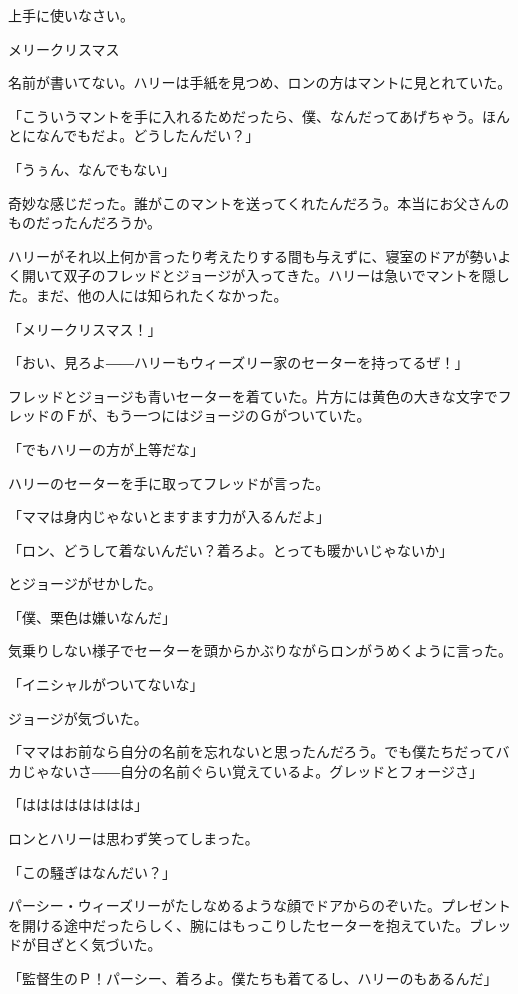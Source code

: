 \documentclass[10pt,a4paper]{article}
\begin{document}
\begin{CJK}{UTF8}{min}
上手に使いなさい。

メリークリスマス



名前が書いてない。ハリーは手紙を見つめ、ロンの方はマントに見とれていた。

「こういうマントを手に入れるためだったら、僕、なんだってあげちゃう。ほんとになんでもだよ。どうしたんだい？」

「うぅん、なんでもない」

奇妙な感じだった。誰がこのマントを送ってくれたんだろう。本当にお父さんのものだったんだろうか。

ハリーがそれ以上何か言ったり考えたりする間も与えずに、寝室のドアが勢いよく開いて双子のフレッドとジョージが入ってきた。ハリーは急いでマントを隠した。まだ、他の人には知られたくなかった。

「メリークリスマス！」

「おい、見ろよ――ハリーもウィーズリー家のセーターを持ってるぜ！」

フレッドとジョージも青いセーターを着ていた。片方には黄色の大きな文字でフレッドのＦが、もう一つにはジョージのＧがついていた。

「でもハリーの方が上等だな」

ハリーのセーターを手に取ってフレッドが言った。

「ママは身内じゃないとますます力が入るんだよ」

「ロン、どうして着ないんだい？着ろよ。とっても暖かいじゃないか」

とジョージがせかした。

「僕、栗色は嫌いなんだ」

気乗りしない様子でセーターを頭からかぶりながらロンがうめくように言った。

「イニシャルがついてないな」

ジョージが気づいた。

「ママはお前なら自分の名前を忘れないと思ったんだろう。でも僕たちだってバカじゃないさ――自分の名前ぐらい覚えているよ。グレッドとフォージさ」

「はははははははは」

ロンとハリーは思わず笑ってしまった。

「この騒ぎはなんだい？」

パーシー・ウィーズリーがたしなめるような顔でドアからのぞいた。プレゼントを開ける途中だったらしく、腕にはもっこりしたセーターを抱えていた。ブレッドが目ざとく気づいた。

「監督生のＰ！パーシー、着ろよ。僕たちも着てるし、ハリーのもあるんだ」


\end{CJK}
\end{document}
